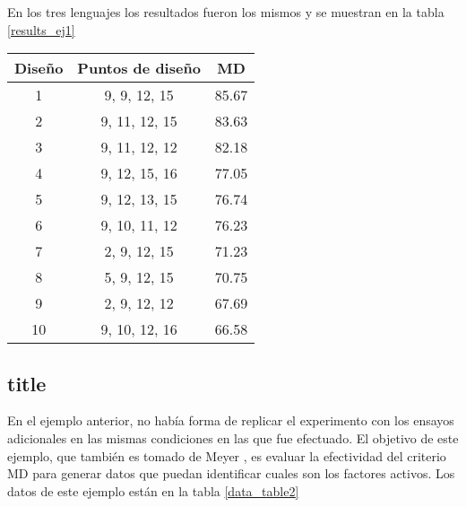 En los tres lenguajes los resultados fueron los mismos y se muestran en la tabla \ref{results_ej1}

\begin{center}
	\begin{tabular}{cc|c}
		Diseño & Puntos de diseño & MD \\
		\hline
		1 & 9, 9, 12, 15 & 85.67 \\
		
		2 & 9, 11, 12, 15 & 83.63 \\
		
		3 &  9, 11, 12, 12 & 82.18 \\
		
		4 & 9, 12, 15, 16 & 77.05 \\
		
		5 & 9, 12, 13, 15 & 76.74 \\
		
		6 & 9, 10, 11, 12 & 76.23 \\
		
		7 & 2, 9, 12, 15 & 71.23 \\
		
		8 & 5, 9, 12, 15 & 70.75 \\
		
		9 & 2, 9, 12, 12 & 67.69 \\
		
		10 & 9, 10, 12, 16 & 66.58 \\
		
	\end{tabular}
	 \label{results_ej1}
\end{center}

\subsection{title}
En el ejemplo anterior, no había forma de replicar el experimento con los ensayos adicionales en las mismas condiciones en las que fue efectuado. El objetivo de este ejemplo, que también es tomado de Meyer , es evaluar la efectividad del criterio MD para generar datos que puedan identificar cuales son los factores activos. Los datos de este ejemplo están en la tabla \ref{data_table2}

